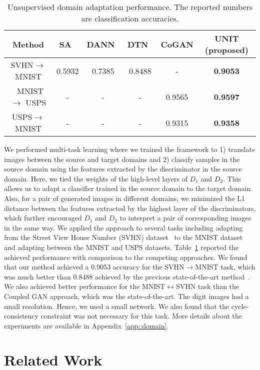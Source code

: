 \documentclass{article}
\begin{document}
\begin{table}[t!]
\caption{\small Unsupervised domain adaptation performance. The reported numbers are classification accuracies.}\label{tab::svhn2mnist}
\centering
\small
{\tabcolsep=8pt
\begin{tabularx}{355pt}{cccccc}
Method & SA~\cite{fernando2013unsupervised} & DANN~\cite{ganin2016domain} & DTN~\cite{taigman2016unsupervised}  &  CoGAN & UNIT (proposed) \tabularnewline\midrule
SVHN$\rightarrow$ MNIST & 0.5932 & 0.7385 & 0.8488 & - &{\bf 0.9053}\tabularnewline\
MNIST$\rightarrow$ USPS & - & -  & -  & 0.9565 &{\bf 0.9597}\tabularnewline
USPS$\rightarrow$ MNIST & - & -  & -  & 0.9315 &{\bf 0.9358}\tabularnewline
\end{tabularx}}
\vspace{-5mm}
\end{table}

We performed multi-task learning where we trained the framework to 1) translate images between the source and target domains and 2) classify samples in the source domain using the features extracted by the discriminator in the source domain. Here, we tied the weights of the high-level layers of $D_1$ and $D_2$. This allows us to adapt a classifier trained in the source domain to the target domain. Also, for a pair of generated images in different domains, we minimized the L1 distance between the features extracted by the highest layer of the discriminators, which further encouraged $D_1$ and $D_2$ to interpret a pair of corresponding images in the same way. We applied the approach to several tasks including adapting from the Street View House Number (SVHN) dataset~\cite{netzer2011reading} to the MNIST dataset and adapting between the MNIST and USPS datasets. Table~\ref{tab::svhn2mnist} reported the achieved performance with comparison to the competing approaches. We found that our method achieved a 0.9053 accuracy for the SVHN$\rightarrow$MNIST task, which was much better than 0.8488 achieved by the previous state-of-the-art method~\cite{taigman2016unsupervised}. We also achieved better performance for the MNIST$\leftrightarrow$SVHN task than the Coupled GAN approach, which was the state-of-the-art. The digit images had a small resolution. Hence, we used a small network. We also found that the cycle-consistency constraint was not necessary for this task. More details about the experiments are available in Appendix~\ref{app::domain}.



 \section{Related Work}
\end{document}
